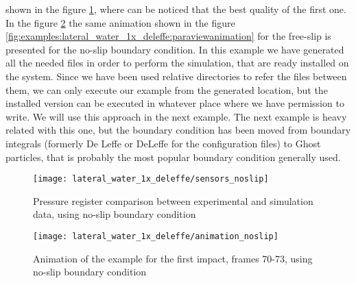 shown in the figure \ref{fig:examples:lateral_water_1x_deleffe:sensors_noslip}, where can be noticed that the
best quality of the first one. In the figure \ref{fig:examples:lateral_water_1x_deleffe:paraviewanimation_noslip}
the same animation shown in the figure \ref{fig:examples:lateral_water_1x_deleffe:paraviewanimation} for the
free-slip is presented for the no-slip boundary condition.\rc
%
In this example we have generated all the needed files in order to perform the simulation, that are ready
installed on the system. Since we have been used relative directories to refer the files between them, we can
only execute our example from the generated location, but the installed version can be executed in whatever place
where we have permission to write. We will use this approach in the next example.\rc
%
The next example is heavy related with this one, but the boundary condition has been moved from boundary
integrals (formerly De Leffe or DeLeffe for the configuration files) to Ghost particles, that is probably the
most popular boundary condition generally used.
%
\begin{figure}[ht!]
  \centering
  \texttt{[image: lateral\_water\_1x\_deleffe/sensors\_noslip]}
  \caption{Pressure register comparison between experimental and simulation data, using no-slip boundary condition}
  \label{fig:examples:lateral_water_1x_deleffe:sensors_noslip}
\end{figure}
%
\begin{figure}[ht!]
  \centering
  \texttt{[image: lateral\_water\_1x\_deleffe/animation\_noslip]}
  \caption{Animation of the example for the first impact, frames 70-73, using no-slip boundary condition}
  \label{fig:examples:lateral_water_1x_deleffe:paraviewanimation_noslip}
\end{figure}
%